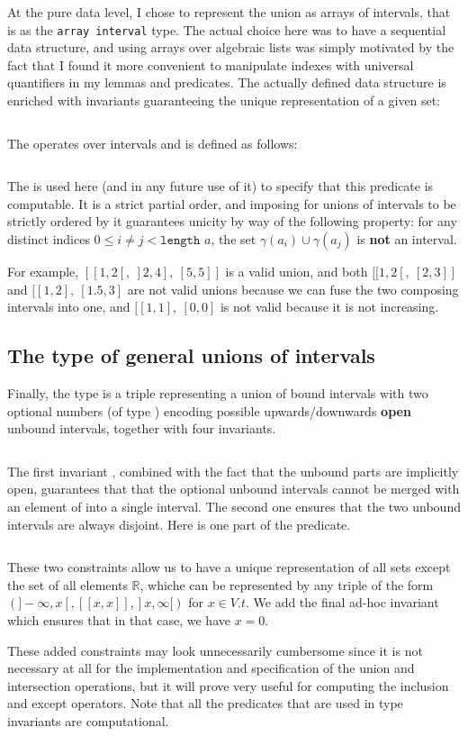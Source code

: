At the pure data level, I chose to represent the union as arrays of intervals, that
is as the \texttt{array interval} type.
%
The actual choice here was to have a sequential data structure, and using
arrays over algebraic lists was simply motivated by the fact that I found it more
convenient to manipulate indexes with universal quantifiers in my lemmas and predicates.
%
The actually defined data structure is enriched with invariants guaranteeing the
unique representation of a given set:
%
\inputminted{\whyml}{why3code/bound_union_type.mlw}
The \minline{(<<)} operates over intervals and is defined as follows:
%
\inputminted{\whyml}{why3code/before_interval_pred.mlw}
%
The  is used here (and in any future use of it) to specify that this
predicate is computable.
%
It is a strict partial order, and imposing for unions of intervals to be strictly
ordered by it guarantees unicity by way of the following property: for any distinct
indices $0 \le i \neq j < \texttt{length } a$, the set $\gamma(a_i) \cup \gamma(a_j)$
is \textbf{not} an interval.

For example, $[[1, 2[,~]2, 4],~[5, 5]]$ is a valid union, and both
$[[1, 2[,~[2, 3]]$ and $[[1, 2],~[1.5, 3]$ are not valid unions because we
can fuse the two composing intervals into one, and $[[1, 1],~[0,0]$ is not valid
because it is not increasing.

\subsection{The type of general unions of intervals}
Finally, the type  is a triple representing a union of bound intervals
with two optional numbers (of type ) encoding possible
upwards/downwards \textbf{open} unbound intervals, together with four invariants.
%
\inputminted{\whyml}{why3code/u_type.mlw}
%
The first invariant , combined with the fact that the
unbound parts are implicitly open, guarantees that that the optional unbound
intervals cannot be merged with an element of  into a single interval.
The second one  ensures that the two unbound intervals
are always disjoint. Here is one part of the  predicate.
%
\inputminted{\whyml}{why3code/bound_unbound_disj_pred.mlw}
%
These two constraints allow us to have a unique representation of all sets except the
set of all elements $\mathbb{R}$, whiche can be represented by any triple of the
form $(]-\infty, x[, [[x,x]], ]x, \infty[)$ for $x\in V.t$.
%
We add the final ad-hoc invariant  which ensures that in
that case, we have $x = 0$.

These added constraints may look unnecessarily cumbersome since it is not necessary at
all for the implementation and specification of the union and intersection
operations, but it will prove very useful for computing the inclusion and except
operators.
%
Note that all the predicates that are used in type invariants are
computational.
